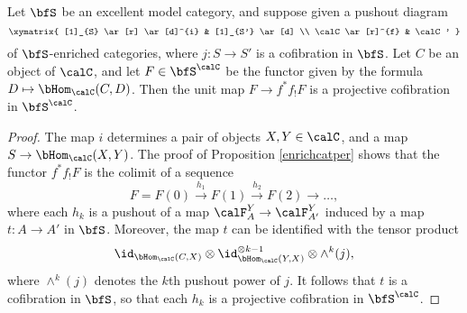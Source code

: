\begin{lemma}\label{pseudopod}
Let $\bfS$ be an excellent model category, and suppose given a pushout diagram
$$ \xymatrix{ [1]_{S} \ar[r] \ar[d]^{i} & [1]_{S'} \ar[d] \\
\calC \ar[r]^{f} & \calC' }$$
of $\bfS$-enriched categories, where $j: S \rightarrow S'$ is a cofibration in $\bfS$.
Let $C$ be an object of $\calC$, and let $F \in \bfS^{\calC}$ be the functor
given by the formula $D \mapsto \bHom_{\calC}(C, D)$. Then
the unit map $F \rightarrow f^{\ast} f_{!} F$ is a projective cofibration in
$\bfS^{\calC}$.
\end{lemma}

\begin{proof}
The map $i$ determines a pair of objects $X,Y \in \calC$, and a map
$S \rightarrow \bHom_{\calC}(X,Y)$. The proof of Proposition \ref{enrichcatper}
shows that the functor $f^{\ast} f_{!} F$ is the colimit of a sequence
$$F = F(0) \stackrel{h_1}{\rightarrow} F(1) \stackrel{h_2}{\rightarrow} F(2) \rightarrow \ldots,$$
where each $h_k$ is a pushout of a map 
$\calF^{Y}_{A} \rightarrow \calF^{Y}_{A'}$ induced by a map
$t: A \rightarrow A'$ in $\bfS$. Moreover, the map
$t$ can be identified with the tensor product 
$$\id_{ \bHom_{\calC}(C, X)} \otimes \id_{ \bHom_{\calC}(Y,X) }^{\otimes k-1}
\otimes \wedge^{k}(j),$$ 
where $\wedge^{k}(j)$ denotes the $k$th pushout power of $j$. 
It follows that $t$ is a cofibration in $\bfS$, so that each $h_k$ is a projective cofibration
in $\bfS^{\calC}$. 
\end{proof}

